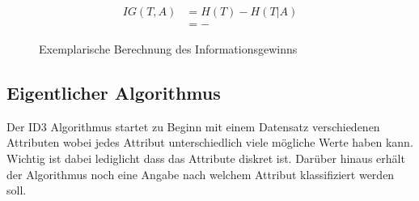 \begin{figure}[htbp]
    \vspace{0.5cm}
    \centering
    
    \begin{align*}
        IG(T,A) &= H(T) - H(T\vert A) \\
                &= -
    \end{align*}
    \caption{Exemplarische Berechnung des Informationsgewinns}
\end{figure}



\subsection{Eigentlicher Algorithmus}
Der ID3 Algorithmus startet zu Beginn mit einem Datensatz verschiedenen Attributen wobei jedes Attribut unterschiedlich viele mögliche Werte haben kann. Wichtig ist dabei lediglicht dass das Attribute diskret ist. Darüber hinaus erhält der Algorithmus noch eine Angabe nach welchem Attribut klassifiziert werden soll. \autocite{ImplementationID3}